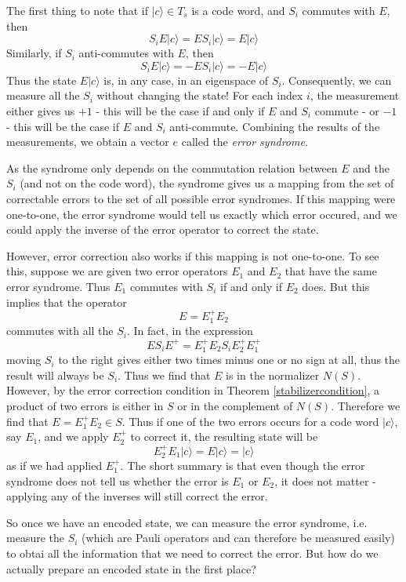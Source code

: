 \documentclass[a4paper, draft]{article}
\theoremstyle{own}
\theoremstyle{remark}
\begin{document}
The first thing to note that if $|c \rangle \in T_s$ is a code word, and $S_i$ commutes with $E$, then 
$$
S_i E |c \rangle = E S_i |c \rangle = E |c \rangle 
$$
Similarly, if $S_i$ anti-commutes with $E$, then
$$
S_i E |c \rangle = - E S_i |c \rangle = - E |c \rangle 
$$
Thus the state $E |c \rangle$ is, in any case, in an eigenspace of $S_i$. Consequently, we can measure all the $S_i$ without changing the state! For each index $i$, the measurement either gives us $+1$ - this will be the case if and only if $E$ and $S_i$ commute - or $-1$ - this will be the case if $E$ and $S_i$ anti-commute. Combining the results of the measurements, we obtain a vector $e$ called the \emph{error syndrome}.

As the syndrome only depends on the commutation relation between $E$ and the $S_i$ (and not on the code word), the syndrome gives us a mapping from the set of correctable errors to the set of all possible error syndromes. If this mapping were one-to-one, the error syndrome would tell us exactly which error occured, and we could apply the inverse of the error operator to correct the state. 

However, error correction also works if this mapping is not one-to-one. To see this, suppose we are given two error operators $E_1$ and $E_2$ that have the same error syndrome. Thus $E_1$ commutes with $S_i$ if and only if $E_2$ does. But this implies that the operator
$$
E = E_1^+ E_2
$$
commutes with all the $S_i$. In fact, in the expression
$$
E S_i E^+ = E_1^+ E_2 S_i E_2^+ E_1^+
$$
moving $S_i$ to the right gives either two times minus one or no sign at all, thus the result will always be $S_i$. Thus we find that $E$ is in the normalizer $N(S)$. However, by the error correction condition in Theorem \ref{stabilizercondition}, a product of two errors is either in $S$ or in the complement of $N(S)$. Therefore we find that $E = E_1^+ E_2 \in S$. Thus if one of the two errors occurs for a code word $|c \rangle$, say $E_1$, and we apply $E_2^+$ to correct it, the resulting state will be
$$
E_2^+ E_1 |c \rangle = E |c \rangle = |c \rangle
$$
as if we had applied $E_1^+$. The short summary is that even though the error syndrome does not tell us whether the error is $E_1$ or $E_2$, it does not matter - applying any of the inverses will still correct the error.

So once we have an encoded state, we can measure the error syndrome, i.e. measure the $S_i$ (which are Pauli operators and can therefore be measured easily) to obtai all the information that we need to correct the error. But how do we actually prepare an encoded state in the first place?
\end{document}
